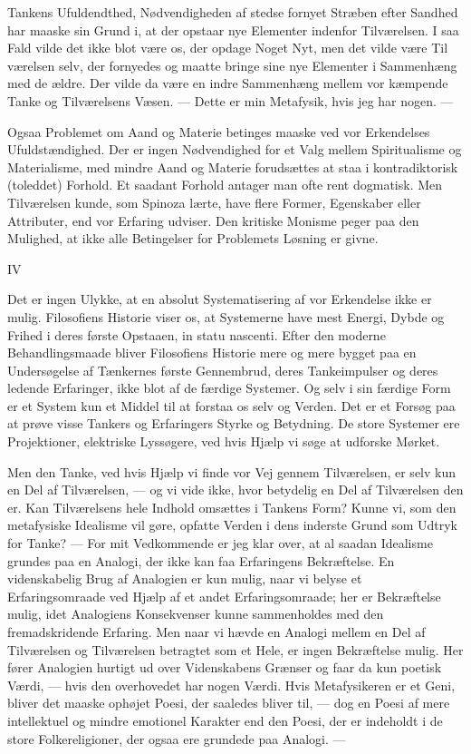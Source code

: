 \documentclass[12pt,a4paper,openany]{book}
\newcommand{\opage}[1]{\marginnote{\footnotesize\textit{[#1]}}}
\begin{document}
Tankens Ufuldendthed, Nødvendigheden af stedse fornyet
Stræben efter Sandhed har maaske sin Grund i, at der opstaar
nye Elementer indenfor Tilværelsen. I saa Fald vilde det
ikke blot være os, der opdage Noget Nyt, men det vilde være Til%
\setcounter{footnote}{0}%
\opage{22}værelsen selv, der fornyedes og maatte bringe sine nye Elementer
i Sammenhæng med de ældre. Der vilde da være en
indre Sammenhæng mellem vor kæmpende Tanke og Tilværelsens
Væsen. --- Dette er min Metafysik, hvis jeg har nogen. ---

Ogsaa Problemet om Aand og Materie betinges maaske ved
vor Erkendelses Ufuldstændighed. Der er ingen Nødvendighed
for et Valg mellem Spiritualisme og Materialisme, med mindre
Aand og Materie forudsættes at staa i kontradiktorisk (toleddet)
Forhold. Et saadant Forhold antager man ofte rent dogmatisk.
Men Tilværelsen kunde, som Spinoza lærte, have flere Former,
Egenskaber eller Attributer, end vor Erfaring udviser. Den kritiske
Monisme peger paa den Mulighed, at ikke alle Betingelser
for Problemets Løsning er givne.

\begin{center}IV\end{center}


Det er ingen Ulykke, at en absolut Systematisering af vor
Erkendelse ikke er mulig. Filosofiens Historie viser os, at Systemerne
have mest Energi, Dybde og Frihed i deres første
Opstaaen, in statu nascenti. Efter den moderne Behandlingsmaade
bliver Filosofiens Historie mere og mere bygget paa en Undersøgelse
af Tænkernes første Gennembrud, deres Tankeimpulser
og deres ledende Erfaringer, ikke blot af de færdige Systemer.
Og selv i sin færdige Form er et System kun et Middel til at
forstaa os selv og Verden. Det er et Forsøg paa at prøve visse
Tankers og Erfaringers Styrke og Betydning. De store Systemer
ere Projektioner, elektriske Lyssøgere, ved hvis Hjælp vi søge
at udforske Mørket.

Men den Tanke, ved hvis Hjælp vi finde vor Vej gennem
Tilværelsen, er selv kun en Del af Tilværelsen, --- og vi vide
ikke, hvor betydelig en Del af Tilværelsen den er. Kan Tilværelsens
hele Indhold omsættes i Tankens Form? Kunne vi,
som den metafysiske Idealisme vil gøre, opfatte Verden i dens
inderste Grund som Udtryk for Tanke? --- For mit Vedkommende
er jeg klar over, at al saadan Idealisme grundes paa en
Analogi, der ikke kan faa Erfaringens Bekræftelse. En videnskabelig
Brug af Analogien er kun mulig, naar vi belyse et Erfaringsomraade
ved Hjælp af et andet Erfaringsomraade; her er
\setcounter{footnote}{0}%
\opage{23}Bekræftelse mulig, idet Analogiens Konsekvenser kunne sammenholdes
med den fremadskridende Erfaring. Men naar vi
hævde en Analogi mellem en Del af Tilværelsen og Tilværelsen
betragtet som et Hele, er ingen Bekræftelse mulig. Her fører
Analogien hurtigt ud over Videnskabens Grænser og faar da
kun poetisk Værdi, --- hvis den overhovedet har nogen Værdi.
Hvis Metafysikeren er et Geni, bliver det maaske ophøjet Poesi,
der saaledes bliver til, --- dog en Poesi af mere intellektuel og
mindre emotionel Karakter end den Poesi, der er indeholdt i
de store Folkereligioner, der ogsaa ere grundede paa Analogi. ---
\end{document}
